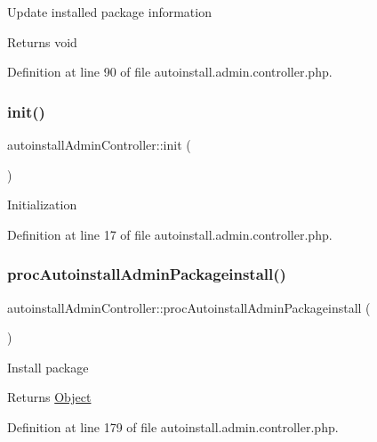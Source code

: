 Update installed package information

\begin{DoxyReturn}{Returns}
void 
\end{DoxyReturn}


Definition at line 90 of file autoinstall.\+admin.\+controller.\+php.

\hypertarget{classautoinstallAdminController_a0679d301d4f5cf35d76a62c4c7584828}{}\label{classautoinstallAdminController_a0679d301d4f5cf35d76a62c4c7584828} 
\subsubsection{\texorpdfstring{init()}{init()}}
{\footnotesize\ttfamily autoinstall\+Admin\+Controller\+::init (\begin{DoxyParamCaption}{ }\end{DoxyParamCaption})}

Initialization 

Definition at line 17 of file autoinstall.\+admin.\+controller.\+php.

\hypertarget{classautoinstallAdminController_af38130de594cfb4f33b6812a6a9f874d}{}\label{classautoinstallAdminController_af38130de594cfb4f33b6812a6a9f874d} 
\subsubsection{\texorpdfstring{proc\+Autoinstall\+Admin\+Packageinstall()}{procAutoinstallAdminPackageinstall()}}
{\footnotesize\ttfamily autoinstall\+Admin\+Controller\+::proc\+Autoinstall\+Admin\+Packageinstall (\begin{DoxyParamCaption}{ }\end{DoxyParamCaption})}

Install package

\begin{DoxyReturn}{Returns}
\hyperlink{classObject}{Object} 
\end{DoxyReturn}


Definition at line 179 of file autoinstall.\+admin.\+controller.\+php.

